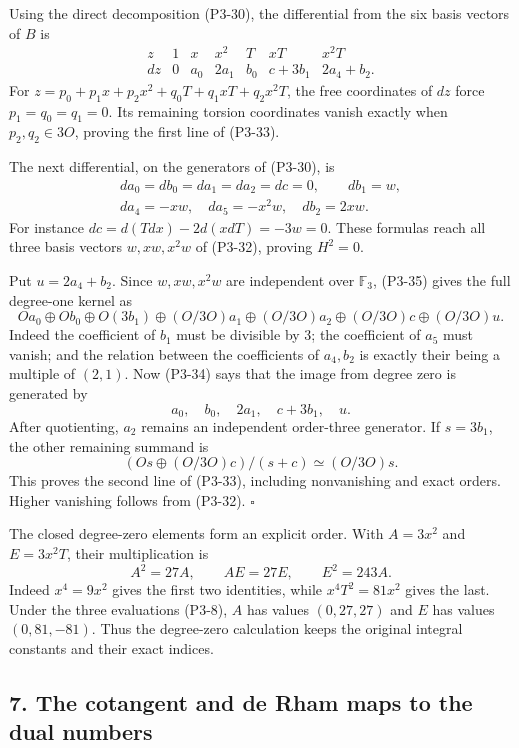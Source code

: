 \documentclass[
]{article}
\begin{document}
Using the direct decomposition (P3-30), the differential from the six
basis vectors of \(B\) is \[
\begin{array}{c|rrrrrr}
z&1&x&x^2&T&xT&x^2T\\ \hline
dz&0&a_0&2a_1&b_0&c+3b_1&2a_4+b_2.
\end{array}
\tag{P3-34}
\] For \(z=p_0+p_1x+p_2x^2+q_0T+q_1xT+q_2x^2T\), the free coordinates of
\(dz\) force \(p_1=q_0=q_1=0\). Its remaining torsion coordinates vanish
exactly when \(p_2,q_2\in3O\), proving the first line of (P3-33).

The next differential, on the generators of (P3-30), is \[
\begin{gathered}
da_0=db_0=da_1=da_2=dc=0,\qquad db_1=w,\\
da_4=-xw,\quad da_5=-x^2w,\quad db_2=2xw.
\end{gathered}
\tag{P3-35}
\] For instance \(dc=d(Tdx)-2d(xdT)=-3w=0\). These formulas reach all
three basis vectors \(w,xw,x^2w\) of (P3-32), proving \(H^2=0\).

Put \(u=2a_4+b_2\). Since \(w,xw,x^2w\) are independent over
\(\mathbb F_3\), (P3-35) gives the full degree-one kernel as \[
Oa_0\oplus Ob_0\oplus O(3b_1)
\oplus(O/3O)a_1\oplus(O/3O)a_2
\oplus(O/3O)c\oplus(O/3O)u.
\tag{P3-36}
\] Indeed the coefficient of \(b_1\) must be divisible by 3; the
coefficient of \(a_5\) must vanish; and the relation between the
coefficients of \(a_4,b_2\) is exactly their being a multiple of
\((2,1)\). Now (P3-34) says that the image from degree zero is generated
by \[
a_0,\quad b_0,\quad 2a_1,\quad c+3b_1,\quad u.
\] After quotienting, \(a_2\) remains an independent order-three
generator. If \(s=3b_1\), the other remaining summand is \[
(Os\oplus(O/3O)c)/(s+c)\simeq(O/3O)s.
\] This proves the second line of (P3-33), including nonvanishing and
exact orders. Higher vanishing follows from (P3-32). \(\square\)

The closed degree-zero elements form an explicit order. With \(A=3x^2\)
and \(E=3x^2T\), their multiplication is \[
A^2=27A,\qquad AE=27E,\qquad E^2=243A.
\tag{P3-37}
\] Indeed \(x^4=9x^2\) gives the first two identities, while
\(x^4T^2=81x^2\) gives the last. Under the three evaluations (P3-8),
\(A\) has values \((0,27,27)\) and \(E\) has values \((0,81,-81)\). Thus
the degree-zero calculation keeps the original integral constants and
their exact indices.

\subsection{7. The cotangent and de Rham maps to the dual
numbers}\label{the-cotangent-and-de-rham-maps-to-the-dual-numbers}
\end{document}
